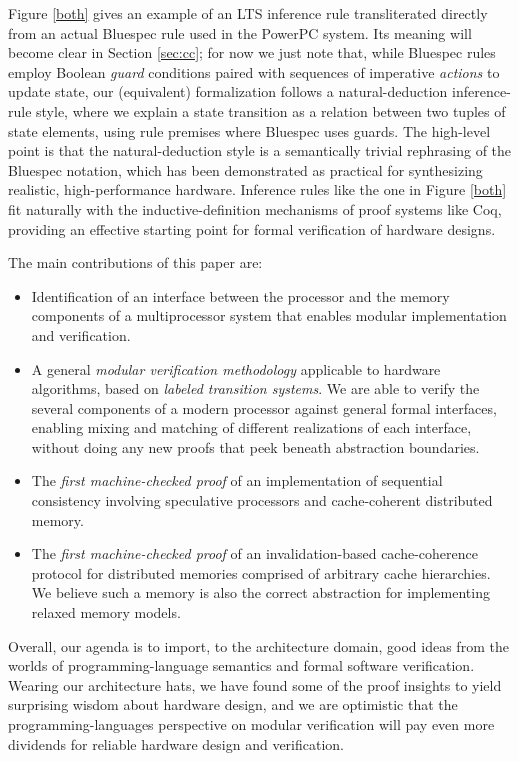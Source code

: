 Figure \ref{both} gives an example of an LTS inference rule
transliterated directly from an actual Bluespec rule used in the PowerPC
system.  Its meaning will become clear in Section \ref{sec:cc};
for now we just note that, while Bluespec rules employ Boolean \emph{guard}
conditions paired with sequences of imperative \emph{actions} to update state,
our (equivalent) formalization follows a natural-deduction inference-rule style,
where we explain a state transition as a relation between two tuples of state
elements, using rule premises where Bluespec uses guards.  The high-level point
is that the natural-deduction style is a semantically trivial rephrasing of the
Bluespec notation, which has been demonstrated as practical for synthesizing
realistic, high-performance hardware.  Inference rules like the one in
Figure \ref{both} fit naturally with the inductive-definition mechanisms of
proof systems like Coq, providing an effective starting point for formal
verification of hardware designs.

The main contributions of this paper are:
\vspace{-.3cm}
\begin{itemize} 
\item Identification of an interface between the processor and the memory
components of a multiprocessor system that enables modular implementation and
verification.

\item A general \emph{modular verification methodology} applicable to hardware
algorithms, based on \emph{labeled transition systems}.  We are able to verify
the several components of a modern processor against general formal interfaces,
enabling mixing and matching of different realizations of each interface,
without doing any new proofs that peek beneath abstraction boundaries.

\item The \emph{first machine-checked proof} of an implementation of sequential
consistency involving speculative processors and cache-coherent distributed
memory.

\item The \emph{first machine-checked proof} of an invalidation-based
cache-coherence protocol for distributed memories comprised of arbitrary cache
hierarchies. We believe such a memory is also the correct abstraction for
implementing relaxed memory models.
\end{itemize}

Overall, our agenda is to import, to the architecture domain, good ideas from
the worlds of programming-language semantics and formal software verification.
Wearing our architecture hats, we have found some of the proof insights to yield
surprising wisdom about hardware design, and we are optimistic that the
programming-languages perspective on modular verification will pay even more
dividends for reliable hardware design and verification.

